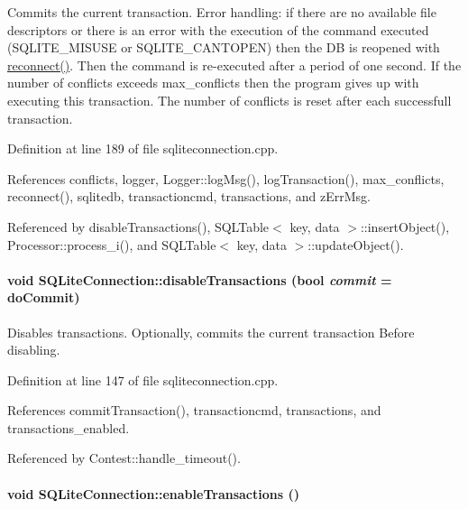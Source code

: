 Commits the current transaction.  Error handling: if there are no available file descriptors or there is an error with the execution of the command executed (SQLITE\_\-MISUSE or SQLITE\_\-CANTOPEN) then the DB is reopened with \hyperlink{classSQLiteConnection_SQLiteConnectiona5}{reconnect()}. Then the command is re-executed after a period of one second. If the number of conflicts exceeds max\_\-conflicts then the program gives up with executing this transaction. The number of conflicts is reset after each successfull transaction. 

Definition at line 189 of file sqliteconnection.cpp.

References conflicts, logger, Logger::log\-Msg(), log\-Transaction(), max\_\-conflicts, reconnect(), sqlitedb, transactioncmd, transactions, and z\-Err\-Msg.

Referenced by disable\-Transactions(), SQLTable$<$ key, data $>$::insert\-Object(), Processor::process\_\-i(), and SQLTable$<$ key, data $>$::update\-Object().\hypertarget{classSQLiteConnection_SQLiteConnectiona9}{
\paragraph[disableTransactions]{\setlength{\rightskip}{0pt plus 5cm}void SQLite\-Connection::disable\-Transactions (bool {\em commit} = do\-Commit)}\hfill}
\label{classSQLiteConnection_SQLiteConnectiona9}


Disables transactions. Optionally, commits the current transaction Before disabling. 

Definition at line 147 of file sqliteconnection.cpp.

References commit\-Transaction(), transactioncmd, transactions, and transactions\_\-enabled.

Referenced by Contest::handle\_\-timeout().\hypertarget{classSQLiteConnection_SQLiteConnectiona8}{
\paragraph[enableTransactions]{\setlength{\rightskip}{0pt plus 5cm}void SQLite\-Connection::enable\-Transactions ()}\hfill}
\label{classSQLiteConnection_SQLiteConnectiona8}


